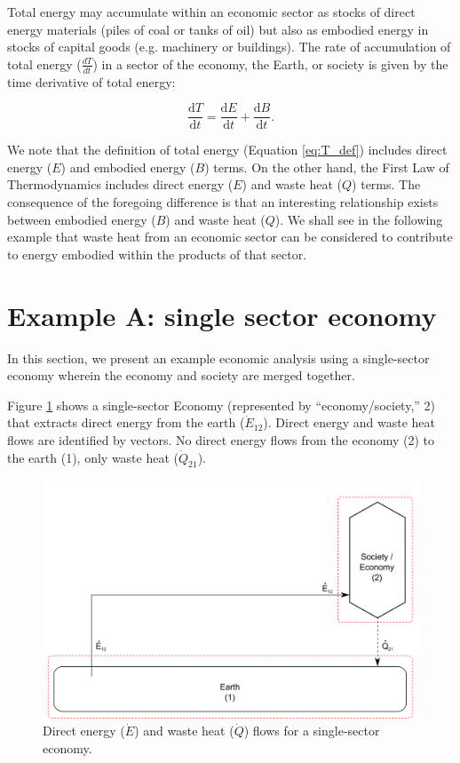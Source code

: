 \documentclass[authoryear,preprint,review,12pt]{elsarticle}
\begin{document}
Total energy may accumulate within an economic sector as stocks of direct energy materials (piles of coal or tanks of oil) but also as embodied energy in stocks of capital goods (e.g. machinery or buildings). The rate of accumulation of total energy ($\frac{dT}{dt}$) in a sector of the economy, the Earth, or society is given by the time derivative of total energy:

\begin{equation} \label{eq:T_accum_def}
	\frac{\mathrm{d}T}{\mathrm{d}t} = \frac{\mathrm{d}E}{\mathrm{d}t} + \frac{\mathrm{d}B}{\mathrm{d}t}.
\end{equation}

We note that the definition of total energy (Equation \ref{eq:T_def}) includes direct energy ($E$) and embodied energy ($B$) terms. On the other hand, the First Law of Thermodynamics includes direct energy ($E$) and waste heat ($Q$) terms. The consequence of the foregoing difference is that an interesting relationship exists between embodied energy ($B$) and waste heat ($Q$). We shall see in the following example that waste heat from an economic sector can be considered to contribute to energy embodied within the products of that sector.

\section{Example A: single sector economy}

In this section, we present an example economic analysis using a single-sector economy wherein the economy and society are merged together.

Figure \ref{fig:single_sector_flows_0} shows a single-sector Economy (represented by ``economy/society,'' 2) that extracts direct energy from the earth ($\dot{E}_{12}$). Direct energy and waste heat flows are identified by vectors. No direct energy flows from the economy (2) to the earth (1), only waste heat ($\dot{Q}_{21}$).

\begin{figure}[h!]
\includegraphics[width=1.0\linewidth]{images/I-O_one_sector_direct_energy.pdf}
\caption{Direct energy ($\dot{E}$) and waste heat ($\dot{Q}$) flows for a single-sector economy. }
\label{fig:single_sector_flows_0}
\end{figure}
\end{document}
